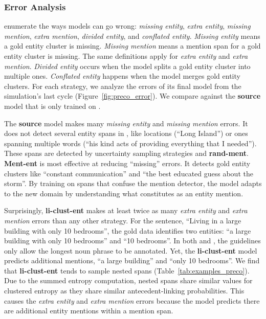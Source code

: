 \subsubsection{Error Analysis}
\label{ssec:error}
\citet{kummerfeld-2013} enumerate the ways \coref{} models can go wrong:
\emph{missing entity}, \emph{extra entity}, \emph{missing mention}, \emph{extra
mention}, \emph{divided entity},
and \emph{conflated entity}. \emph{Missing entity} means a gold entity
cluster is missing. \emph{Missing mention} means a mention span for a gold
entity cluster is missing.  The same definitions apply for \emph{extra entity}
and \emph{extra mention}.
\emph{Divided entity} occurs when the model splits a gold entity cluster into
multiple ones. \emph{Conflated entity} happens when the model merges
gold entity clusters. For each strategy, we analyze the
errors of its final model from the
simulation's last cycle (Figure~\ref{fig:preco_error}).
We compare against the
\textbf{source} model that is only trained on \ontonotes{}.

The \textbf{source}
model makes many \emph{missing entity} and \emph{missing mention} errors.
It does not detect several entity spans in \preco{}, like
locations (``Long Island'') or ones spanning multiple words (``his kind
acts of providing everything that I needed'').
These spans are detected by uncertainty sampling strategies and \textbf{rand-ment}. \textbf{Ment-ent} is most effective at reducing ``missing''
errors. It detects gold entity clusters like
``constant communication'' and ``the best educated guess about the storm''.
By training on spans that confuse the mention detector, the model adapts to the
new domain by understanding what constitutes as an entity mention.

Surprisingly, \textbf{li-clust-ent} makes at least twice as many \emph{extra entity} and
\emph{extra mention}
errors than any other strategy. For the sentence, ``Living in a large building with only 10 bedrooms'', the
gold data identifies two entities: ``a large building with only 10
bedrooms'' and ``10 bedrooms''.
In both \ontonotes{} and \preco{}, the guidelines only allow the longest noun
phrase to be annotated.
Yet, the \textbf{li-clust-ent} model predicts additional mentions,
``a large building'' and ``only 10 bedrooms''.
We find that \textbf{li-clust-ent} tends to sample nested
spans (Table~\ref{tab:examples_preco}). Due to the summed entropy computation, nested spans
share similar values for clustered entropy as they share similar
antecedent-linking probabilities. This causes the \emph{extra entity} and
\emph{extra mention} errors because the model predicts there are additional
entity mentions within a mention span.


